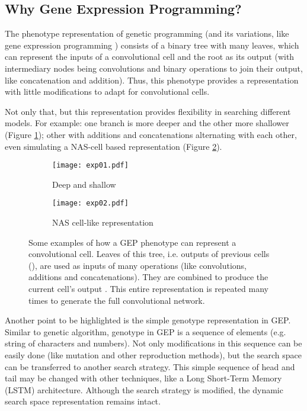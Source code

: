\documentclass[conference]{IEEEtran}
\begin{document}
	\subsection{Why Gene Expression Programming?}
	
	The phenotype representation of genetic programming (and its variations, like gene expression programming \cite{ferreira2001gene}) consists of a binary tree with many leaves, which can represent the inputs of a convolutional cell and the root as its output (with intermediary nodes being convolutions and binary operations to join their output, like concatenation and addition).
	Thus, this phenotype provides a representation with little modifications to adapt for convolutional cells.
	
	Not only that, but this representation provides flexibility in searching different models.    
	For example: one branch is more deeper and the other more shallower (Figure \ref{fig:example1}); other with additions and concatenations alternating with each other, even simulating a NAS-cell based representation (Figure \ref{fig:example2}).
	
	\begin{figure}[htb]
		\centering
		\hfill
		\begin{subfigure}[b]{0.17\textwidth}
			\centering
			\texttt{[image: exp01.pdf]}			
			\caption{Deep and shallow}
			\label{fig:example1}
		\end{subfigure}
		\hfill
		\begin{subfigure}[b]{0.3\textwidth}
			\centering
			\texttt{[image: exp02.pdf]}
			\caption{NAS cell-like representation}
			\label{fig:example2}
		\end{subfigure}
		\hfill
		\caption{Some examples of how a GEP phenotype can represent a convolutional cell. Leaves of this tree, i.e. outputs of previous cells (), are used as inputs of many operations (like convolutions, additions and concatenations). They are combined to produce the current cell's output . This entire representation is repeated many times to generate the full convolutional network.}
		\label{fig:examples}
	\end{figure}
	
	Another point to be highlighted is the simple genotype representation in GEP. 
	Similar to genetic algorithm, genotype in GEP is a sequence of elements (e.g. string of characters and numbers).
	Not only modifications in this sequence can be easily done (like mutation and other reproduction methods), but the search space can be transferred to another search strategy.
	This simple sequence of head and tail may be changed with other techniques, like a Long Short-Term Memory (LSTM) architecture.
	Although the search strategy is modified, the dynamic search space representation remains intact.
	
\end{document}
